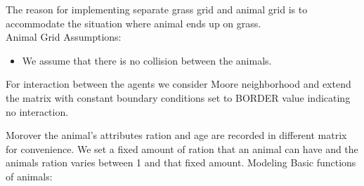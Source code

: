 \documentclass[prl,12pt,citeautoscript,reprint]{revtex4-1}
\begin{document}
The reason for implementing separate grass grid and animal grid is to accommodate the situation where animal ends up on grass.
\\
 Animal Grid Assumptions:
\begin{itemize}
\item We assume that there is no collision between the animals.
\end{itemize}
For interaction between the agents we consider Moore neighborhood and extend the matrix with constant boundary conditions set to BORDER value indicating no interaction. 

Morover the animal's attributes ration and age are recorded in different matrix for convenience.
We set a fixed amount of ration that an animal can have and the animals ration varies between 1 and that fixed amount.
Modeling Basic functions of animals:
\end{document}
